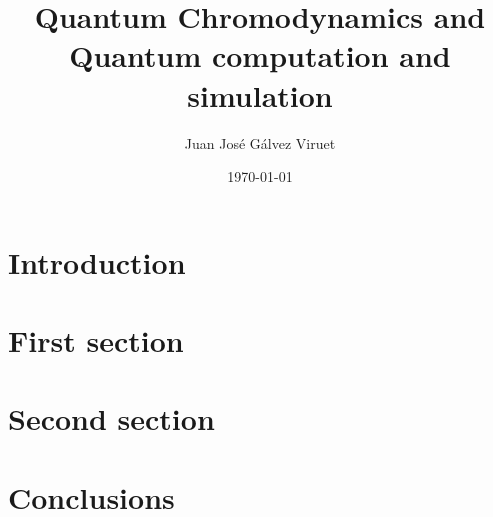 \documentclass[a4paper,10pt]{article}
\begin{document}
\title{Quantum Chromodynamics and \\ Quantum computation and simulation}
\author{Juan José Gálvez Viruet}
\date{\today}
\maketitle

\begin{abstract}
\noindent \blindtext
\end{abstract}

\begin{multicols}{2}
\section{Introduction} 
 
\blindtext

\blindtext
\section{First section}
\blindtext

\section{Second section}
\blindtext

\blindtext

\section{Conclusions}

\blindtext

\blindtext

\nocite{*}


\end{multicols}
\end{document}
